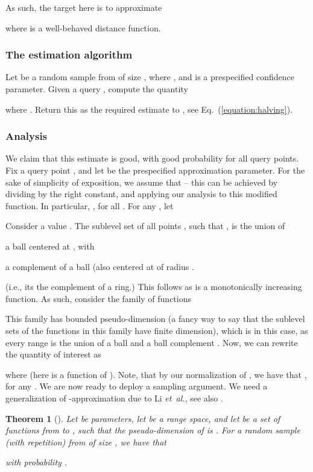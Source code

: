 \documentclass[12pt]{article}
\newtheorem{theorem}{Theorem}[section] \newtheorem{lemma}[theorem]{Lemma}
\theoremstyle{remark}{\theorembodyfont{\rm} \newtheorem{remark}[theorem]{Remark}}
\newcommand{\thmlab}[1]{{\label{theo:#1}}}
\newcommand{\Eqref}[1]{Eq.~(\ref{equation:#1})}
\newcommand{\etal}{\textit{et~al.}\xspace}
\begin{document}
As such, the target here is to approximate

where  is a well-behaved distance function. 

\subsubsection{The estimation algorithm}

Let  be a random sample from  of size , where
, and  is a prespecified confidence
parameter. Given a query , compute the quantity

where . Return this as the required estimate to
, see \Eqref{halving}.


\subsubsection{Analysis}

We claim that this estimate is good, with good probability for all
query points.  Fix a query point , and let  be the prespecified approximation parameter.  For the sake of
simplicity of exposition, we assume that
 -- this can be
achieved by dividing  by the right constant, and applying
our analysis to this modified function. In particular,
, for all . For any , let

Consider a value . The sublevel set of all points ,
such that , is the union of
\begin{inparaenum}[(i)]
    \item a ball centered at , with 
    \item a complement of a ball (also centered at  of radius
    .
\end{inparaenum}
(i.e., its the complement of a ring.)  This follows as  is a
monotonically increasing function. As such, consider the family of
functions

This family has bounded pseudo-dimension (a fancy way to say that the
sublevel sets of the functions in this family have finite \VC
dimension), which is  in this case, as every range is the union
of a ball and a ball complement \cite[Section 5.2.1.1]{h-gaa-11}.
Now, we can rewrite the quantity of interest as

where  (here  is a function of
).  Note, that by our normalization of , we have that , for any . We
are now ready to deploy a sampling argument. We need a generalization
of -approximation due to Li \etal \cite{lls-ibscl-01}, see also
\cite{h-gaa-11}.

\begin{theorem}[\cite{lls-ibscl-01}]
    \thmlab{SAMPLING}Let  be parameters, let  be a range space, and let  be
    a set of functions from  to , such that
    the pseudo-dimension of  is .  For a random
    sample   (with repetition) from
     of size , we have
    that
    
    with probability .
\end{theorem}
\end{document}
